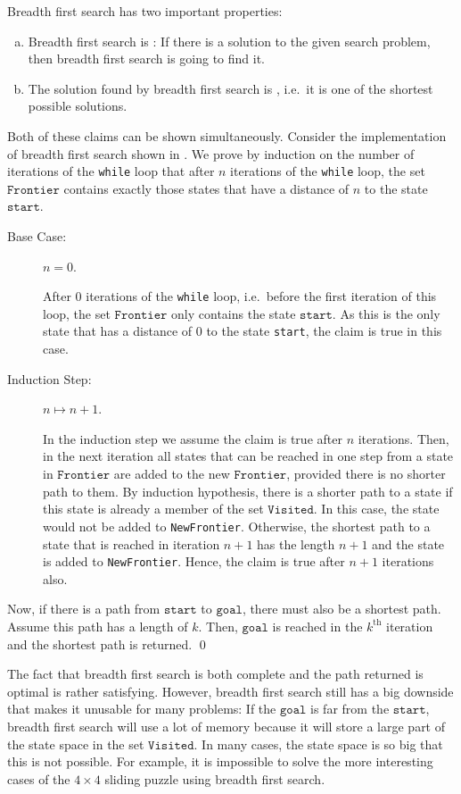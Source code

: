 Breadth first search has two important properties:
\begin{enumerate}[(a)]
\item Breadth first search is :  If there is a solution to the given
      search problem, then breadth first search is going to find it.
\item The solution found by breadth first search is ,  i.e.~it is one of the
      shortest possible solutions.
\end{enumerate}
\proof
Both of these claims can be shown simultaneously.  Consider the implementation of breadth first
search shown in .  We prove by induction on the number of
iterations of the \texttt{while} loop that after $n$ iterations of the \texttt{while} loop,
the set $\texttt{Frontier}$ contains exactly those states that have a distance of $n$ to the state
$\texttt{start}$.
\begin{description}
\item[Base Case:] $n = 0$.

      After $0$ iterations of the \texttt{while} loop, i.e.~before the first iteration of this loop,
      the set $\texttt{Frontier}$ only contains the state $\texttt{start}$.  As this is the only state that has a
      distance of $0$ to the state \texttt{start}, the claim is true in this case.
\item[Induction Step:] $n \mapsto n+1$.

      In the induction step we assume the claim is true after $n$ iterations.  Then, in the next iteration all
      states that can be reached in one step from a state in $\texttt{Frontier}$ are added to the new $\texttt{Frontier}$,
      provided there is no shorter path to them.  By induction hypothesis, there is a shorter path to a state
      if this state is already a member of the set $\texttt{Visited}$.  In this case, the state would not be
      added to \texttt{NewFrontier}.  Otherwise, the shortest path to a state that is
      reached in iteration $n+1$ has the length $n+1$ and the state is added to \texttt{NewFrontier}.  Hence,
      the claim is true after $n+1$ iterations also.
\end{description}
Now, if there is a path from $\texttt{start}$ to $\texttt{goal}$, there must also be a shortest
path.  Assume this path has a length of $k$.  Then, $\texttt{goal}$ is reached in the $k^{\textrm{th}}$
iteration and the shortest path is returned.
\qed

The fact that breadth first search is both complete and the path returned is optimal is rather
satisfying.  However, breadth first search still has a big downside that makes it unusable for
many problems:  If the $\texttt{goal}$ is far from the $\texttt{start}$, breadth first search will use
a lot of memory because it will store a large part of the state space in the set
$\texttt{Visited}$.  In many cases, the state space is so big that this is not possible.  For example, it is
impossible to solve the more interesting cases of the $4 \times 4$ sliding puzzle using breadth first search.


